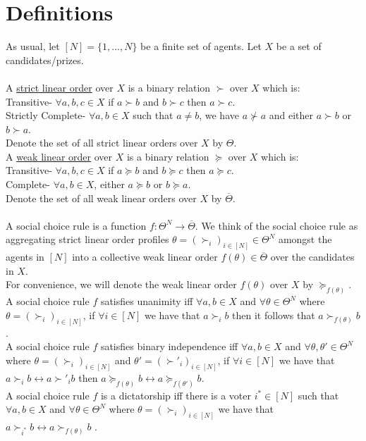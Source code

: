 \documentclass[11pt]{article}
\title{}
\date{}
\theoremstyle{definition}
\theoremstyle{plain}
\begin{document}
\section{Definitions}

As usual, let $[N]=\{1,...,N\}$ be a finite set of agents. Let $X$ be a set of candidates/prizes.
\\
\\
A \underline{strict linear order} over $X$ is a binary relation $\succ$ over $X$ which is:
\\
Transitive- $\forall a,b,c \in X$ if $a \succ b$ and $b \succ c$ then $a \succ c$.
\\
Strictly Complete- $\forall a,b \in X$ such that $a \neq b$, we have $a \not \succ a$ and either $a\succ b$ or $b \succ a$.
\\
Denote the set of all strict linear orders over $X$ by $\Theta$.
\\
A \underline{weak linear order} over $X$ is a binary relation $\succeq$ over $X$ which is:
\\
Transitive- $\forall a,b,c \in X$ if $a \succeq b$ and $b \succeq c$ then $a \succeq c$.
\\
Complete- $\forall a,b \in X$,  either $a\succeq b$ or $b \succeq a$.
\\
Denote the set of all weak linear orders over $X$ by $\overline{\Theta}$.
\\
\\
A social choice rule is a function $f: \Theta^N \to \overline{\Theta}$. We think of the social choice rule as aggregating strict linear order profiles $\theta=(\succ_i)_{i \in [N]}\in \Theta^N$ amongst the agents in $[N]$ into a collective weak linear order $f(\theta) \in \overline{\Theta}$ over the candidates in $X$. 
\\
For convenience, we will denote the weak linear order $f(\theta)$ over $X$ by $\succeq_{f(\theta)}$.
\\
A social choice rule $f$ satisfies unanimity iff $\forall a,b \in X$ and $\forall \theta \in \Theta^N$ where $\theta=(\succ_i)_{i \in [N]}$, if $\forall i \in [N]$ we have that $a\succ_i b$ then it follows that $a \succ_{f(\theta)} b$. 
\\
A social choice rule $f$ satisfies binary independence iff $\forall a,b \in X$ and $\forall \theta, \theta' \in \Theta^N$  where $\theta=(\succ_i)_{i \in [N]}$ and $\theta'=(\succ'_i)_{i \in [N]}$, if $\forall i \in [N]$ we have that $a \succ_i b \leftrightarrow a \succ'_i b$ then $a \succeq_{f(\theta)} b \leftrightarrow a \succeq_{f(\theta')} b $.
\\
A social choice rule $f$ is a dictatorship iff there is a voter $i^* \in [N]$ such that $\forall a,b \in X$ and $\forall \theta \in \Theta^N$ where $\theta=(\succ_i)_{i \in [N]}$ we have that $a \succ_{i^*} b \leftrightarrow a \succ_{f(\theta)} b $ . 
\end{document}
